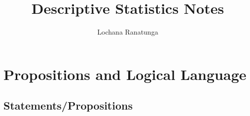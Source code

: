 \documentclass{article}
\begin{document}
\title{Descriptive Statistics Notes}
\author{Lochana Ranatunga}
\maketitle

\section{Propositions and Logical Language}
\subsection*{Statements/Propositions}
\end{document}
